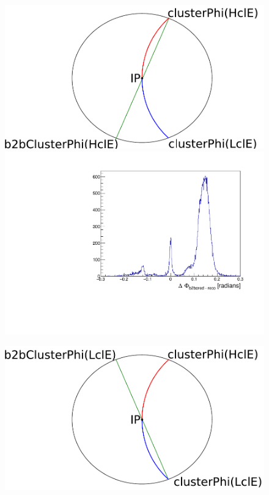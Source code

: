 \documentclass[a4paper,11pt,twosided,final,german,openbib,pdftex,listof=totoc,bibliography=totoc]{scrbook}
\begin{document}
\begin{figure}[h!]
	\centering
	\begin{minipage}[b]{0.45\linewidth}
		\centering
		\includegraphics[width=\textwidth]{Bilder/b2b_2}
		\includegraphics[width=\textwidth]{Cuts/Data/b2b_TagProbe.pdf}
	\end{minipage}
	\hspace{0.5cm}
	\begin{minipage}[b]{0.45\linewidth}
		\centering
		\includegraphics[width=\textwidth]{Bilder/b2b_3}

\end{minipage}
\end{figure}
\end{document}
